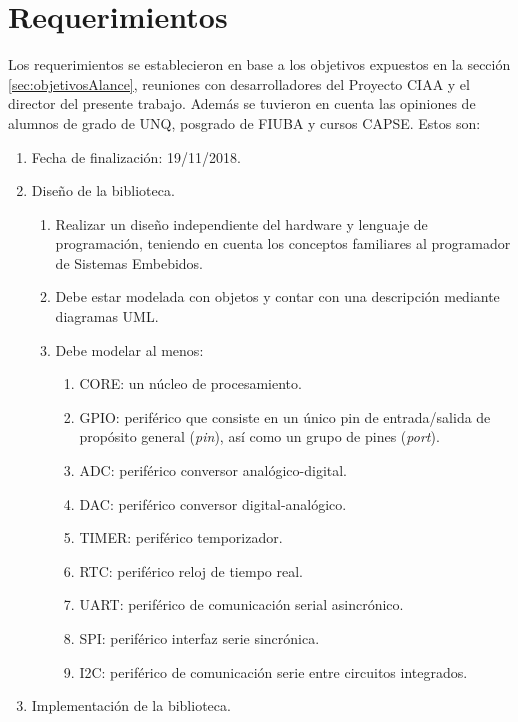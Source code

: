 \section{Requerimientos}
\label{sec:requerimientos}

Los requerimientos se establecieron en base a los objetivos expuestos en la sección \ref{sec:objetivosAlance}, reuniones con desarrolladores del Proyecto CIAA y el director del presente trabajo. Además se tuvieron en cuenta las opiniones de alumnos de grado de UNQ, posgrado de FIUBA y cursos CAPSE. Estos son:

\begin{enumerate}
\item Fecha de finalización: 19/11/2018.
\item Diseño de la biblioteca.
\begin{enumerate}%
\item Realizar un diseño independiente del hardware y lenguaje de programación, teniendo en cuenta los conceptos familiares al programador de Sistemas Embebidos.
\item Debe estar modelada con objetos y contar con una descripción mediante diagramas UML.
\item Debe modelar al menos:
\begin{enumerate}
\item CORE: un núcleo de procesamiento.
\item GPIO: periférico que consiste en un único pin de entrada/salida de propósito general (\emph{pin}), así como un grupo de pines (\emph{port}).
\item ADC: periférico conversor analógico-digital.
\item DAC: periférico conversor digital-analógico.
\item TIMER: periférico temporizador.
\item RTC: periférico reloj de tiempo real.
\item UART: periférico de comunicación serial asincrónico.
\item SPI: periférico interfaz serie sincrónica.
\item I2C: periférico de comunicación serie entre circuitos integrados.
\end{enumerate}
\end{enumerate}
\item Implementación de la biblioteca.

\end{enumerate}
